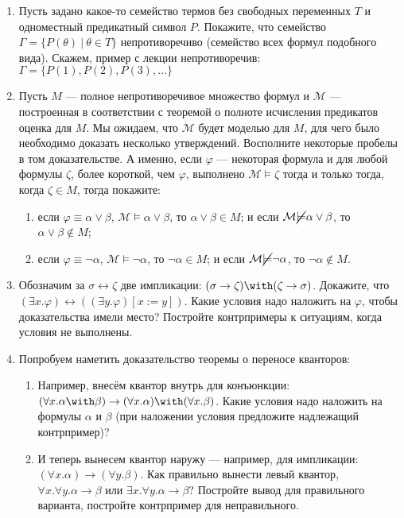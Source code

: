 \documentclass[10pt,a4paper,oneside]{article}
\begin{document}
\begin{enumerate}
\item Пусть задано какое-то семейство термов без свободных переменных $T$ и одноместный предикатный символ $P$.
Покажите, что семейство $\Gamma = \{ P(\theta)\ |\ \theta \in T \}$ непротиворечиво (семейство всех формул подобного вида).
Скажем, пример с лекции непротиворечив: $\Gamma = \{ P(1), P(2), P(3), \dots \}$
\item Пусть $M$ ---  полное непротиворечивое множество формул и $\mathcal{M}$ --- построенная в соответствии с теоремой о 
полноте исчисления предикатов оценка для $M$. Мы ожидаем, что $\mathcal{M}$ будет моделью для $M$, для чего было необходимо доказать
несколько утверждений. Восполните некоторые пробелы в том доказательстве. А именно, если $\varphi$ --- 
некоторая формула и для любой формулы $\zeta$, более короткой, чем $\varphi$, выполнено
$\mathcal{M}\models\zeta$ тогда и только тогда, когда $\zeta\in M$, тогда покажите:
\begin{enumerate}
\item если $\varphi \equiv \alpha\vee\beta$, $\mathcal{M}\models\alpha\vee\beta$, то $\alpha\vee\beta\in M$; и если $\mathcal{M}\cancel{\models}\alpha\vee\beta$, то $\alpha\vee\beta\notin M$;
\item если $\varphi \equiv \neg\alpha$, $\mathcal{M}\models\neg\alpha$, то $\neg\alpha\in M$; и если $\mathcal{M}\cancel{\models}\neg\alpha$, то $\neg\alpha\notin M$.
\end{enumerate}
\item Обозначим за $\sigma\leftrightarrow\zeta$ две импликации: $(\sigma\rightarrow\zeta)\with(\zeta\rightarrow\sigma)$.
Докажите, что $(\exists x.\varphi) \leftrightarrow ((\exists y.\varphi)[x := y])$. Какие условия надо наложить на $\varphi$, чтобы доказательства имели место?
Постройте контрпримеры к ситуациям, когда условия не выполнены.
\item Попробуем наметить доказательство теоремы о переносе кванторов:
\begin{enumerate}
\item Например, внесём квантор внутрь для конъюнкции: $(\forall x.\alpha\with\beta) \rightarrow (\forall x.\alpha)\with(\forall x.\beta)$. Какие условия надо наложить на формулы $\alpha$ и $\beta$
(при наложении условия предложите надлежащий контрпример)?
\item И теперь вынесем квантор наружу --- например, для импликации: $(\forall x.\alpha)\rightarrow(\forall y.\beta)$. Как правильно вынести левый квантор, 
$\forall x.\forall y.\alpha\rightarrow\beta$ или $\exists x.\forall y.\alpha\rightarrow\beta$? Постройте вывод для правильного варианта, постройте контрпример для неправильного.

\end{enumerate}
\end{enumerate}
\end{document}
